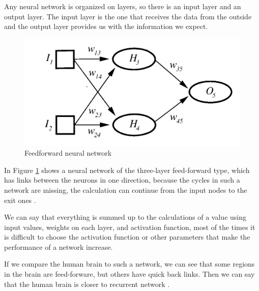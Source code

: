Any neural network is organized on layers, so there is an input layer and an output layer.
The input layer is the one that receives the data from the outside and 
the output layer provides us with the information we expect. \cite{book.neuronal.network.1995}

\begin{figure}[htbp]
	\centerline{\includegraphics[scale=0.75]{fig/neuronal-network.png}}  
  \caption{Feedforward neural network  \cite{book.neuronal.network.1995}}
  \label{fig:feedforward}
\end{figure}

In Figure \ref{fig:feedforward} shows a neural network of the three-layer feed-forward type, which has links between the neurons in one direction,
because the cycles in such a network are missing, 
the calculation can continue from the input nodes to the exit ones \cite{book.neuronal.network.1995}.

We can say that everything is summed up to the calculations of a value using input values, weights on each layer,
and activation function, most of the times it is difficult to choose the activation function or other parameters that make the performance of a network increase.

If we compare the human brain to such a network, we can see that some regions in the brain are feed-forware, but others have quick back links. 
Then we can say that the human brain is closer to recurrent network \cite{book.neuronal.network.1995}.

